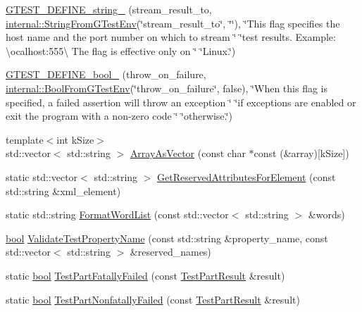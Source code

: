 \begin{DoxyCompactItemize}
\item 
\hyperlink{namespacetesting_a145c2b7b4242b148b8d167f737b0d7c6}{G\+T\+E\+S\+T\+\_\+\+D\+E\+F\+I\+N\+E\+\_\+string\+\_\+} (stream\+\_\+result\+\_\+to, \hyperlink{namespacetesting_1_1internal_ac54dabc540bf79c2de91add679bfb93b}{internal\+::\+String\+From\+G\+Test\+Env}(\char`\"{}stream\+\_\+result\+\_\+to\char`\"{}, \char`\"{}\char`\"{}), \char`\"{}This flag specifies the host name and the port number on which to stream \char`\"{} \char`\"{}test results. Example\+: \textbackslash{}ocalhost\+:555\textbackslash{} The flag is effective only on \char`\"{} \char`\"{}Linux.\char`\"{})
\item 
\hyperlink{namespacetesting_a7598962574c3fff25237b78f0de81aa7}{G\+T\+E\+S\+T\+\_\+\+D\+E\+F\+I\+N\+E\+\_\+bool\+\_\+} (throw\+\_\+on\+\_\+failure, \hyperlink{namespacetesting_1_1internal_a67132cdce23fb71b6c38ee34ef81eb4c}{internal\+::\+Bool\+From\+G\+Test\+Env}(\char`\"{}throw\+\_\+on\+\_\+failure\char`\"{}, false), \char`\"{}When this flag is specified, a failed assertion will throw an exception \char`\"{} \char`\"{}if exceptions are enabled or exit the program with a non-\/zero code \char`\"{} \char`\"{}otherwise.\char`\"{})
\item 
{\footnotesize template$<$int k\+Size$>$ }\\std\+::vector$<$ std\+::string $>$ \hyperlink{namespacetesting_a956d4c522454fa6dfd75b5bbbefe8f9e}{Array\+As\+Vector} (const char $\ast$const (\&array)\mbox{[}k\+Size\mbox{]})
\item 
static std\+::vector$<$ std\+::string $>$ \hyperlink{namespacetesting_acb3fdfadf475a3c2f5e22a3dae73532a}{Get\+Reserved\+Attributes\+For\+Element} (const std\+::string \&xml\+\_\+element)
\item 
static std\+::string \hyperlink{namespacetesting_a4354761948a5cf56fdf905418a0f78f1}{Format\+Word\+List} (const std\+::vector$<$ std\+::string $>$ \&words)
\item 
\hyperlink{classbool}{bool} \hyperlink{namespacetesting_a4c9bd414747bf0563bfdb32a2307dcdf}{Validate\+Test\+Property\+Name} (const std\+::string \&property\+\_\+name, const std\+::vector$<$ std\+::string $>$ \&reserved\+\_\+names)
\item 
static \hyperlink{classbool}{bool} \hyperlink{namespacetesting_a9f19442d566c7eaec0702b9fcf282b63}{Test\+Part\+Fatally\+Failed} (const \hyperlink{classtesting_1_1TestPartResult}{Test\+Part\+Result} \&result)
\item 
static \hyperlink{classbool}{bool} \hyperlink{namespacetesting_af256d104ca665115eb291f762bb659e3}{Test\+Part\+Nonfatally\+Failed} (const \hyperlink{classtesting_1_1TestPartResult}{Test\+Part\+Result} \&result)

\end{DoxyCompactItemize}
